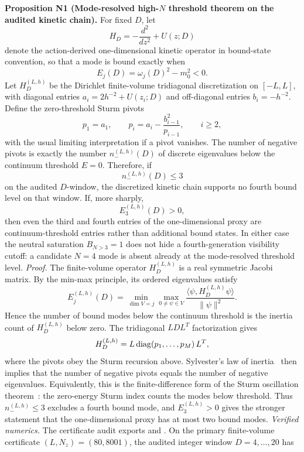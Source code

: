 \documentclass[aps,prd,onecolumn,notitlepage,nofootinbib,superscriptaddress,11pt,floatfix]{revtex4-2}
\begin{document}
\medskip\noindent\textbf{Proposition N1 (Mode-resolved high-\texorpdfstring{$N$}{N} threshold theorem on the audited kinetic chain).}
For fixed \(D\), let
\[
H_D=-\frac{d^2}{dz^2}+U(z;D)
\]
denote the action-derived one-dimensional kinetic operator in bound-state convention, so that a mode is bound exactly when
\[
E_j(D)=\omega_j(D)^2-m_0^2<0.
\]
Let \(H_D^{(L,h)}\) be the Dirichlet finite-volume tridiagonal discretization on \([-L,L]\), with diagonal entries \(a_i=2h^{-2}+U(z_i;D)\) and off-diagonal entries \(b_i=-h^{-2}\).  Define the zero-threshold Sturm pivots
\[
p_1=a_1,\qquad
p_i=a_i-\frac{b_{i-1}^2}{p_{i-1}},\qquad i\ge2,
\]
with the usual limiting interpretation if a pivot vanishes.  The number of negative pivots is exactly the number \(n_-^{(L,h)}(D)\) of discrete eigenvalues below the continuum threshold \(E=0\).  Therefore, if
\[
n_-^{(L,h)}(D)\le 3
\]
on the audited \(D\)-window, the discretized kinetic chain supports no fourth bound level on that window.  If, more sharply,
\[
E_3^{(L,h)}(D)>0,
\]
then even the third and fourth entries of the one-dimensional proxy are continuum-threshold entries rather than additional bound states.  In either case the neutral saturation \(B_{N>3}=1\) does not hide a fourth-generation visibility cutoff: a candidate \(N=4\) mode is absent already at the mode-resolved threshold level.
\emph{Proof.}
The finite-volume operator \(H_D^{(L,h)}\) is a real symmetric Jacobi matrix.  By the min-max principle, its ordered eigenvalues satisfy
\[
E_j^{(L,h)}(D)
=
\min_{\dim V=j}\max_{0\ne\psi\in V}
\frac{\langle\psi,H_D^{(L,h)}\psi\rangle}{\|\psi\|^2}.
\]
Hence the number of bound modes below the continuum threshold is the inertia count of \(H_D^{(L,h)}\) below zero.  The tridiagonal \(LDL^T\) factorization gives
\[
H_D^{(L,h)}=L\,{\rm diag}(p_1,\dots,p_M)\,L^T,
\]
where the pivots obey the Sturm recursion above.  Sylvester's law of inertia~\cite{HornJohnson2012} then implies that the number of negative pivots equals the number of negative eigenvalues.  Equivalently, this is the finite-difference form of the Sturm oscillation theorem~\cite{Teschl2014}: the zero-energy Sturm index counts the modes below threshold.  Thus \(n_-^{(L,h)}\le3\) excludes a fourth bound mode, and \(E_3^{(L,h)}>0\) gives the stronger statement that the one-dimensional proxy has at most two bound modes.
\emph{Verified numerics.}
The certificate audit  exports  and .  On the primary finite-volume certificate \((L,N_z)=(80,8001)\), the audited integer window \(D=4,\dots,20\) has
\end{document}
